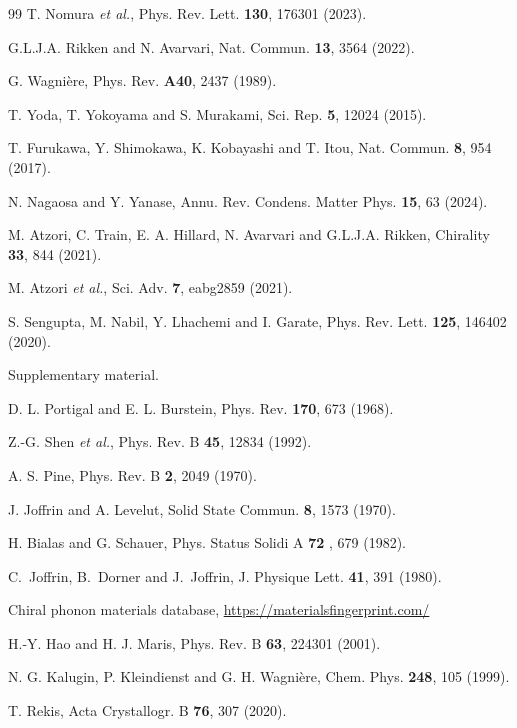 \documentclass[prl,twocolumn]{revtex4-2}
\begin{document}
\begin{thebibliography}{99}
 T. Nomura \textit{et al.}, Phys. Rev. Lett. \textbf{130},
176301 (2023).

 G.L.J.A. Rikken and N. Avarvari, Nat. Commun. \textbf{
13}, 3564 (2022).

 G. Wagni\`{e}re, Phys. Rev. \textbf{A40}, 2437
(1989).

 T. Yoda, T. Yokoyama and S. Murakami, Sci. Rep.
\textbf{5}, 12024 (2015).

 T. Furukawa, Y. Shimokawa, K. Kobayashi and T. Itou,
Nat. Commun. \textbf{8}, 954 (2017).

 N. Nagaosa and Y. Yanase, Annu. Rev. Condens.
Matter Phys. \textbf{15}, 63 (2024).

 M. Atzori, C. Train, E. A. Hillard, N. Avarvari and
G.L.J.A. Rikken, Chirality \textbf{33}, 844 (2021).

 M. Atzori \textit{et al.}, Sci. Adv. \textbf{7},
eabg2859 (2021).

 S. Sengupta, M. Nabil, Y. Lhachemi and I. Garate,
Phys. Rev. Lett. \textbf{125}, 146402 (2020).

 Supplementary material.

 D. L. Portigal and E. L. Burstein, Phys. Rev.
\textbf{170}, 673 (1968).

 Z.-G. Shen \textit{et al.}, Phys. Rev. B \textbf{45}, 12834
(1992).



 A. S. Pine, Phys. Rev. B \textbf{2}, 2049 (1970).

 J. Joffrin and A. Levelut, Solid State Commun. \textbf{8},
1573 (1970).

 H. Bialas and G. Schauer, Phys. Status Solidi A \textbf{72}
, 679 (1982).

 C.~Joffrin, B.~Dorner and J.~Joffrin, J. Physique
Lett. \textbf{41}, 391 (1980).

 Chiral phonon materials database,
\url{https://materialsfingerprint.com/}

 H.-Y. Hao and H. J. Maris, Phys. Rev. B \textbf{63}, 224301
(2001).

 N. G. Kalugin, P. Kleindienst and G. H. Wagni\`{e}re,
Chem. Phys. \textbf{248}, 105 (1999).

 T. Rekis, Acta Crystallogr. B \textbf{76}, 307 (2020).
\end{thebibliography}
\end{document}
